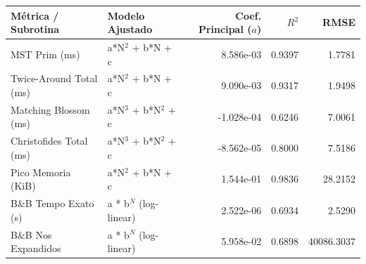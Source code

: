 \begin{tabular}{llrrr}
\hline
\textbf{Métrica / Subrotina} & \textbf{Modelo Ajustado} & \textbf{Coef. Principal ($a$)} & \textbf{$R^2$} & \textbf{RMSE} \\
\hline
MST Prim (ms) & a*N$^2$ + b*N + c & 8.586e-03 & 0.9397 & 1.7781 \\
Twice-Around Total (ms) & a*N$^2$ + b*N + c & 9.090e-03 & 0.9317 & 1.9498 \\
Matching Blossom (ms) & a*N$^3$ + b*N$^2$ + c & -1.028e-04 & 0.6246 & 7.0061 \\
Christofides Total (ms) & a*N$^3$ + b*N$^2$ + c & -8.562e-05 & 0.8000 & 7.5186 \\
Pico Memoria (KiB) & a*N$^2$ + b*N + c & 1.544e-01 & 0.9836 & 28.2152 \\
B\&B Tempo Exato (s) & a * b$^N$ (log-linear) & 2.522e-06 & 0.6934 & 2.5290 \\
B\&B Nos Expandidos & a * b$^N$ (log-linear) & 5.958e-02 & 0.6898 & 40086.3037 \\
\hline
\end{tabular}
